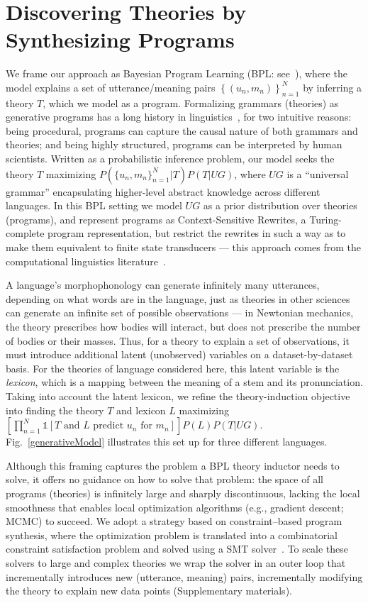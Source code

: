 \documentclass[12pt]{article}
\newcommand{\indicator}{\mathds{1}} %
\begin{document}
\section*{Discovering Theories by Synthesizing Programs} 

We frame our approach as Bayesian Program Learning (BPL:
see~\cite{lake2015human}), where the model explains a set of
utterance/meaning pairs $\left\{(u_n,m_n) \right\}_{n = 1}^N$ by
inferring a theory $T$, which we model as a program.  Formalizing
grammars (theories) as generative programs has a long history in
linguistics~\cite{chomsky1968sound},
for two intuitive reasons: being procedural,
programs can capture the causal nature of
both grammars and theories;
and being highly structured,
programs can be interpreted by human scientists.
Written as a probabilistic
inference problem, our model seeks the theory $T$ maximizing
$P(\{u_n,m_n\}_{n = 1}^N | T)P(T|UG)$, where $UG$ is a ``universal
grammar'' encapsulating  higher-level abstract knowledge across
different languages.  In this BPL setting we model $UG$ as a prior
distribution over theories (programs), and represent programs as
Context-Sensitive Rewrites, a Turing-complete program representation,
but restrict the rewrites in such a way as to make them equivalent to
finite state transducers --- this approach comes from the computational
linguistics literature~\cite{beesley2003finite}.

A language's morphophonology can generate infinitely many
utterances,
depending on what words are in the language,
just as theories in other sciences
can generate an infinite set of
possible observations --- in Newtonian mechanics,
the theory prescribes
how bodies will interact,
but does not prescribe
the number of bodies or their masses.
Thus, for a theory to explain a set of observations,
it must introduce additional latent (unobserved)
variables on a dataset-by-dataset basis.
For the theories of language considered here,
this latent variable is the \emph{lexicon},
which is a mapping between
the meaning of a stem and its pronunciation.
Taking into account the latent lexicon,
we refine the theory-induction objective into
finding the theory $T$ and lexicon $L$ maximizing
$\left[\prod_{n = 1}^N \indicator[T\text{ and }L\text{ predict }u_n\text{ for }m_n] \right]P(L)P(T|UG)$.
Fig.~\ref{generativeModel} illustrates this set up for three different languages.

Although this framing captures the problem a BPL theory inductor needs to solve,
it offers no guidance on how to solve that problem:
the space of all programs (theories) is infinitely large and
sharply discontinuous, lacking the local smoothness that
enables local optimization algorithms (e.g., gradient descent; MCMC)
to succeed.
We adopt a strategy based on constraint--based program synthesis,
where the optimization problem is translated
into a combinatorial constraint satisfaction 
problem and solved using
a SMT solver~\cite{solar2006combinatorial}.
To scale these solvers to
large and complex theories 
we wrap the solver in
an outer loop that incrementally
introduces new (utterance, meaning) pairs,
incrementally modifying the theory to explain
new data points (Supplementary materials).
\end{document}
